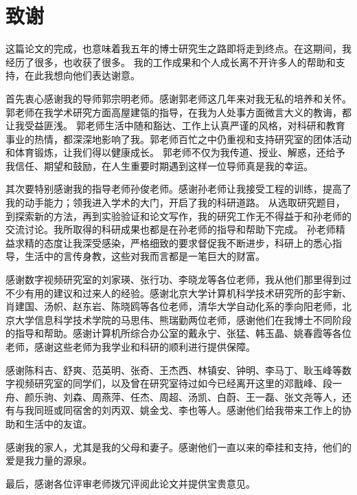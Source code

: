 \chapter{致谢}

这篇论文的完成，也意味着我五年的博士研究生之路即将走到终点。在这期间，我经历了很多，也收获了很多。
我的工作成果和个人成长离不开许多人的帮助和支持，在此我想向他们表达谢意。

首先衷心感谢我的导师郭宗明老师。感谢郭老师这几年来对我无私的培养和关怀。郭老师在我学术研究方面高屋建瓴的指导，在我为人处事方面微言大义的教诲，都让我受益匪浅。
郭老师生活中随和豁达、工作上认真严谨的风格，对科研和教育事业的热情，都深深地影响了我。郭老师百忙之中仍重视和支持研究室的团体活动和体育锻炼，让我们得以健康成长。
郭老师不仅为我传道、授业、解惑，还给予我信任、期望和鼓励，在人生重要时期遇到这样一位导师真是我的幸运。

其次要特别感谢我的指导老师孙俊老师。感谢孙老师让我接受工程的训练，提高了我的动手能力；领我进入学术的大门，开启了我的科研道路。
从选取研究题目，到探索新的方法，再到实验验证和论文写作，我的研究工作无不得益于和孙老师的交流讨论。我所取得的科研成果也都是在孙老师的指导和帮助下完成。
孙老师精益求精的态度让我深受感染，严格细致的要求督促我不断进步，科研上的悉心指导，生活中的言传身教，这些对我而言都是一笔巨大的财富。

感谢数字视频研究室的刘家瑛、张行功、李晓龙等各位老师，我从他们那里得到过不少有用的建议和过来人的经验。感谢北京大学计算机科学技术研究所的彭宇新、肖建国、汤帜、赵东岩、陈晓鸥等各位老师，清华大学自动化系的季向阳老师，北京大学信息科学技术学院的马思伟、熊瑞勤两位老师，感谢他们在我博士不同阶段的指导和帮助。感谢计算机所综合办公室的戴永宁、张猛、韩玉晶、姚春霞等各位老师，感谢这些老师为我学业和科研的顺利进行提供保障。

感谢陈科吉、舒爽、范英明、张奇、王杰西、林镇安、钟明、李马丁、耿玉峰等数字视频研究室的同学们，以及曾在研究室待过如今已经离开这里的邓戬峰、段一舟、颜乐驹、刘森、周燕萍、任杰、周超、汤凯、白蔚、王一磊、张文尧等人，还有与我同班或同宿舍的刘丙双、姚金戈、李也等人。感谢他们给我带来工作上的协助和生活中的友谊。

感谢我的家人，尤其是我的父母和妻子。感谢他们一直以来的牵挂和支持，他们的爱是我力量的源泉。

最后，感谢各位评审老师拨冗评阅此论文并提供宝贵意见。